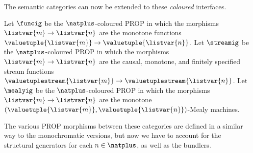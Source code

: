 \documentclass{lmcs}
\begin{document}
The semantic categories can now be extended to these \emph{coloured} interfaces.

\begin{defi}
    Let \(\funcig\) be the \(\natplus\)-coloured PROP in which the morphisms
    \(\listvar{m} \to \listvar{n}\) are the monotone functions
    \(\valuetuple{\listvar{m}} \to \valuetuple{\listvar{n}}\).
    Let \(\streamig\) be the \(\natplus\)-coloured PROP in which the morphisms
    \(\listvar{m} \to \listvar{n}\) are the causal, monotone, and finitely
    specified stream functions \(
    \valuetuplestream{\listvar{m}} \to \valuetuplestream{\listvar{n}}
    \).
    Let \(\mealyig\) be the \(\natplus\)-coloured PROP in which the morphisms
    \(\listvar{m} \to \listvar{n}\) are the monotone
    \((\valuetuple{\listvar{m}}, \valuetuple{\listvar{n}})\)-Mealy machines.
\end{defi}

The various PROP morphisms between these categories are defined in a similar way
to the monochromatic versions, but now we have to account for the structural
generators for each \(n \in \natplus\), as well as the bundlers.
\end{document}
